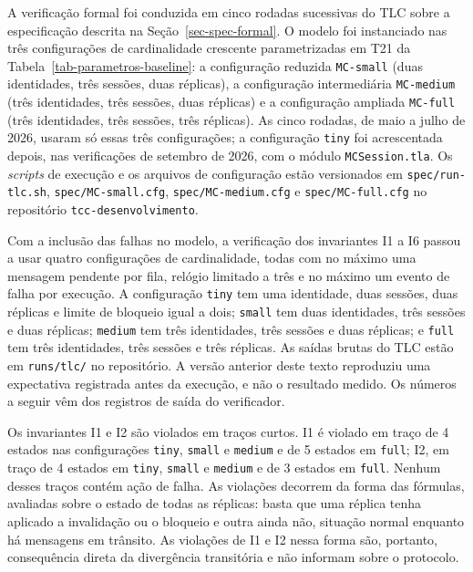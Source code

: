 A verificação formal foi conduzida em cinco rodadas sucessivas do TLC sobre a especificação descrita na Seção~\ref{sec-spec-formal}. O modelo foi instanciado nas três configurações de cardinalidade crescente parametrizadas em T21 da Tabela~\ref{tab-parametros-baseline}: a configuração reduzida \texttt{MC-small} (duas identidades, três sessões, duas réplicas), a configuração intermediária \texttt{MC-medium} (três identidades, três sessões, duas réplicas) e a configuração ampliada \texttt{MC-full} (três identidades, três sessões, três réplicas). As cinco rodadas, de maio a julho de 2026, usaram só essas três configurações; a configuração \texttt{tiny} foi acrescentada depois, nas verificações de setembro de 2026, com o módulo \texttt{MCSession.tla}. Os \emph{scripts} de execução e os arquivos de configuração estão versionados em \texttt{spec/run-tlc.sh}, \texttt{spec/MC-small.cfg}, \texttt{spec/MC-medium.cfg} e \texttt{spec/MC-full.cfg} no repositório \texttt{tcc-desenvolvimento}.

Com a inclusão das falhas no modelo, a verificação dos invariantes I1 a I6 passou a usar quatro configurações de cardinalidade, todas com no máximo uma mensagem pendente por fila, relógio limitado a três e no máximo um evento de falha por execução. A configuração \texttt{tiny} tem uma identidade, duas sessões, duas réplicas e limite de bloqueio igual a dois; \texttt{small} tem duas identidades, três sessões e duas réplicas; \texttt{medium} tem três identidades, três sessões e duas réplicas; e \texttt{full} tem três identidades, três sessões e três réplicas. As saídas brutas do TLC estão em \texttt{runs/tlc/} no repositório. A versão anterior deste texto reproduziu uma expectativa registrada antes da execução, e não o resultado medido. Os números a seguir vêm dos registros de saída do verificador.

Os invariantes I1 e I2 são violados em traços curtos. I1 é violado em traço de 4 estados nas configurações \texttt{tiny}, \texttt{small} e \texttt{medium} e de 5 estados em \texttt{full}; I2, em traço de 4 estados em \texttt{tiny}, \texttt{small} e \texttt{medium} e de 3 estados em \texttt{full}. Nenhum desses traços contém ação de falha. As violações decorrem da forma das fórmulas, avaliadas sobre o estado de todas as réplicas: basta que uma réplica tenha aplicado a invalidação ou o bloqueio e outra ainda não, situação normal enquanto há mensagens em trânsito. As violações de I1 e I2 nessa forma são, portanto, consequência direta da divergência transitória e não informam sobre o protocolo.

